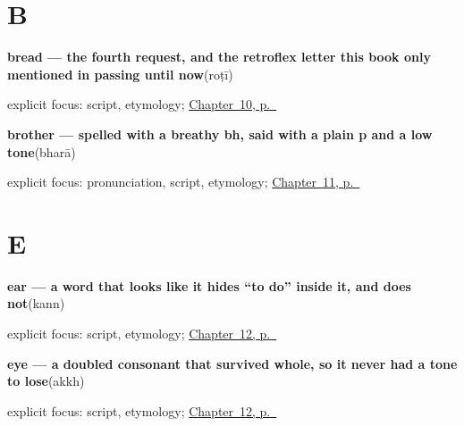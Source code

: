 \section*{B}

\noindent\begin{minipage}[t]{\linewidth}
\raggedright
\textbf{bread — the fourth request, and the retroflex letter this book only mentioned in passing until now}\enspace\emph{}\enspace(roṭī)\par
\footnotesize explicit focus: script, etymology; \hyperref[ch:pa-request-food-drink]{Chapter~10, p.~\pageref*{ch:pa-request-food-drink}}
\end{minipage}\par\smallskip

\noindent\begin{minipage}[t]{\linewidth}
\raggedright
\textbf{brother — spelled with a breathy bh, said with a plain p and a low tone}\enspace\emph{}\enspace(bharā)\par
\footnotesize explicit focus: pronunciation, script, etymology; \hyperref[ch:pa-friend-and-family]{Chapter~11, p.~\pageref*{ch:pa-friend-and-family}}
\end{minipage}\par\smallskip

\section*{E}

\noindent\begin{minipage}[t]{\linewidth}
\raggedright
\textbf{ear — a word that looks like it hides \textquotedblleft{}to do\textquotedblright{} inside it, and does not}\enspace\emph{}\enspace(kann)\par
\footnotesize explicit focus: script, etymology; \hyperref[ch:pa-face-parts]{Chapter~12, p.~\pageref*{ch:pa-face-parts}}
\end{minipage}\par\smallskip

\noindent\begin{minipage}[t]{\linewidth}
\raggedright
\textbf{eye — a doubled consonant that survived whole, so it never had a tone to lose}\enspace\emph{}\enspace(akkh)\par
\footnotesize explicit focus: script, etymology; \hyperref[ch:pa-face-parts]{Chapter~12, p.~\pageref*{ch:pa-face-parts}}
\end{minipage}\par\smallskip

